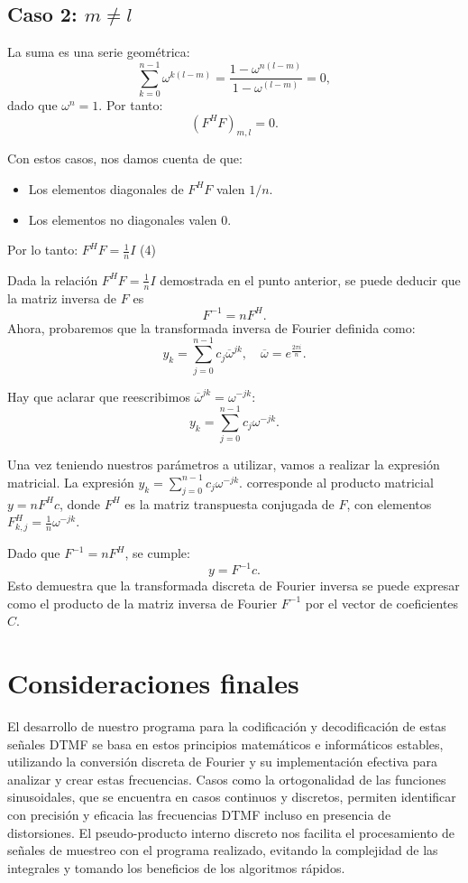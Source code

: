 \documentclass{article}
\begin{document}
\subsection*{Caso 2: \(m \neq l\)}
La suma es una serie geométrica:
\[
\sum_{k=0}^{n-1} \omega^{k(l-m)} = \frac{1 - \omega^{n(l-m)}}{1 - \omega^{(l-m)}} = 0, 
\]
dado que \(\omega^n = 1\). Por tanto:
\[
(F^H F)_{m,l} = 0.
\]


Con estos casos, nos damos cuenta de que:
\begin{itemize}
    \item Los elementos diagonales de \(F^H F\) valen \(1/n\).
    \item Los elementos no diagonales valen 0.
\end{itemize}
Por lo tanto: \(F^H F = \frac{1}{n}I\)   (4)

Dada la relación \(F^H F = \frac{1}{n}I\) demostrada en el punto anterior, se puede deducir que la matriz inversa de \(F\) es \[
F^{-1} = n F^H.
\]
Ahora, probaremos que la transformada inversa de Fourier definida como:
\[
y_k = \sum_{j=0}^{n-1} c_j \overline{\omega}^{jk}, \quad \overline{\omega} = e^{\frac{2\pi i}{n}}.
\]

Hay que aclarar que reescribimos \(\overline{\omega}^{jk} = \omega^{-jk}\):
\[
y_k = \sum_{j=0}^{n-1} c_j \omega^{-jk}.
\]

Una vez teniendo nuestros parámetros a utilizar, vamos a realizar la expresión matricial. La expresión \(y_k = \sum_{j=0}^{n-1} c_j \omega^{-jk}.\) corresponde al producto matricial \(y = n F^H c\), donde \(F^H\) es la matriz transpuesta conjugada de $F$, con elementos  \(F^H_{k,j} = \frac{1}{n} \omega^{-jk}\).


Dado que \(F^{-1} = n F^H\), se cumple:
\[
y = F^{-1} c.
\]
Esto demuestra que la transformada discreta de Fourier inversa se puede expresar como el producto de la matriz inversa de Fourier \(F^{-1}\) por el vector de coeficientes \(C\).


\section{Consideraciones finales}

El desarrollo de nuestro programa para la codificación y decodificación de estas señales DTMF se basa en estos principios matemáticos e informáticos estables, utilizando la conversión discreta de Fourier y su implementación efectiva para analizar y crear estas frecuencias. Casos como la ortogonalidad de las funciones sinusoidales, que se encuentra en casos continuos y discretos, permiten identificar con precisión y eficacia las frecuencias DTMF incluso en presencia de distorsiones. El pseudo-producto interno discreto nos facilita el procesamiento de señales de muestreo con el programa realizado, evitando la complejidad de las integrales y tomando los beneficios de los algoritmos rápidos.
\end{document}
